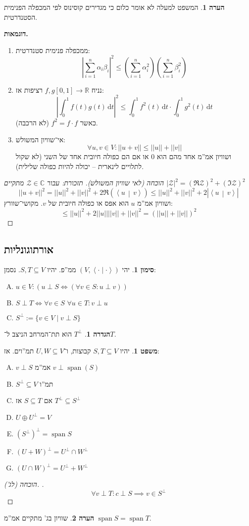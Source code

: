 \documentclass[a4paper]{article}
\newcommand\R     {\mathbb{R}}
\newcommand\C     {\mathbb{C}}
\newcommand\zc    {\mathcal{Z}}
\newcommand\ra    {\rangle}
\newcommand\la    {\langle}
\newcommand\dt    {\,\mathrm{d}t}
\DeclareMathOperator{\Sp}      {span}
\newcommand\co        {\colon}
\newcommand\norm[1]   {\left \vert \left \vert #1 \right \vert \right \vert}
\newcommand\smut      {\left \la \cdot \mid \cdot \right \ra}
\newcommand\mut [2]   {\left \la #1 \,\middle\vert\, #2 \right \ra}
\newcommand\ag        {\alpha}
\newcommand\bg        {\beta}
\newcommand\sof[1]    {\left | #1 \right |}
\newcommand\cl [1]    {\left ( #1 \right )}
\theoremstyle{definition}
\newtheorem{Theorem}{משפט}
\newtheorem{definition}{הגדרה}
\newtheorem{Remark}{הערה}
\newtheorem{Notion}{סימון}
\newcommand\theo  [1] {\begin{Theorem}#1\end{Theorem}}
\newcommand\defi  [1] {\begin{definition}#1\end{definition}}
\newcommand\rmark [1] {\begin{Remark}#1\end{Remark}}
\newcommand\noti  [1] {\begin{Notion}#1\end{Notion}}
\begin{document}
	\rmark{המשפט למעלה לא אומר כלום כי מגדירים קוסינוס לפי המכפלה הפנימית הסטנדרטית. }
	
	\textbf{דוגמאות. }
	\begin{enumerate}
		\item ממכפלה פנימית סטנדרטית: 
		\[ \sof{\sum_{i = 1}^{n}\ag_i \bg_i}^2 \le \cl{\sum_{i = 1}^{n}\ag_i^2} \cl{\sum_{i = 1}^{n}\bg_i^2} \]
		\item  נניח $f, g [0, 1] \to \R$ רציפות אז: 
		\[ \sof{\int^1_0 f(t)g(t) \dt}^2 \le \int_{0}^{1}f^2(t) \dt \cdot\int^1_0 g^2(t) \dt \]
		כאשר $f^2 = f \cdot f$ (לא הרכבה). 
		\item אי־שוויון המשולש: 
		\[ \forall u, v \in V \co \norm{u + v} \le \norm{u} + \norm{v} \]
		ושוויון אמ''מ אחד מהם הוא $0$ או אם הם כפולה חיובית אחד של השני (לא שקול לתלויים לינארית – יכולה להיות כפולה שלילית). 
	\end{enumerate}
	\begin{proof}[הוכחה (לאי שוויון המשולש)]
		\textit{תזכורת: עבור $\zc \in \C$ מתקיים $\sof{\zc}^2 = (\Re \zc)^2 + (\Im \zc)^2$}
		\[ \norm{u + v}^2 = \norm{u}^2 + \norm{v}^2 + 2\Re(\mut{u}{v}) \le \norm{u}^2 + \norm{v}^2 + 2\sof{\mut{u}{v}}  \]
		ושוויון אמ''מ $u$ הוא אפס או כפולה חיובית של $v$. מקושי־שוורץ: 
		\[ \le \norm{u}^2 + 2\norm{u}\norm{v} + \norm{v}^2 = \cl{\norm{u} + \norm{v}}^2 \]
	\end{proof}
	
	\subsection{אורתוגונליות}
	\noti{יהי $(V, \smut)$ ממ''פ. יהיו $S, T \subseteq V$. נסמן: 
		\begin{enumerate}[A.]
			\item \hfil $u \in V \co \cl{u \perp S \iff (\forall v \in S\co u \perp v)}$
			\item \hfil $S \perp T \iff \forall v \in S \,\, \forall u \in T \co v \perp u$ 
			\item \hfil $S^{\perp} := \{v \in V \mid v \perp S\}$
	\end{enumerate}}
	\defi{$T^{\perp}$ הוא תת־המרחב הניצב ל־$T$. }
	\theo{יהיו $S, T \subseteq V$ קבוצות, ו־$U, W \subseteq V$ תמ''וים. אז: 
		\begin{enumerate}[A.]
			\item $v \perp S$ אמ''מ $v \perp \Sp(S)$
			\item $S^{\perp} \subseteq V$ תמ''ו
			\item אם $S \subseteq T$ אז $T^\perp \subseteq S^\perp$
			\item \hfil $U \oplus U^{\perp} = V$
			\item \hfil $\cl{S^\perp}^\perp = \Sp S$
			\item \hfil $(U + W)^{\perp} = U^{\perp} \cap W^{\perp}$
			\item \hfil $(U \cap W)^{\perp} = U^{\perp} + W^{\perp}$
	\end{enumerate}}
	\begin{proof}[הוכחה (לג'). ]
		\[ \forall v \perp T \co c \perp S \implies v \in S^{\perp} \]
	\end{proof}
	\rmark{שוויון בג' מתקיים אמ''מ $\Sp S = \Sp T$. }
	
\end{document}
